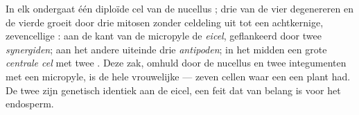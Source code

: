 \begin{proposition}\label{prop:b2:angiosperm-reproduction:embryosac}
In elk  ondergaat één diploïde cel van de nucellus ;
drie van de vier  degenereren en de vierde groeit door drie
mitosen zonder celdeling uit tot een achtkernige, zevencellige
\emph{}: aan de kant van de micropyle de \emph{eicel},
geflankeerd door twee \emph{synergiden}; aan het andere uiteinde drie
\emph{antipoden}; in het midden een grote \emph{centrale cel} met twee
\emph{}. Deze zak, omhuld door de nucellus en twee integumenten
met een micropyle, is de hele vrouwelijke  --- zeven cellen waar
een  een plant had. De twee  zijn genetisch identiek aan de
eicel, een feit dat van belang is voor het endosperm.
\end{proposition}

